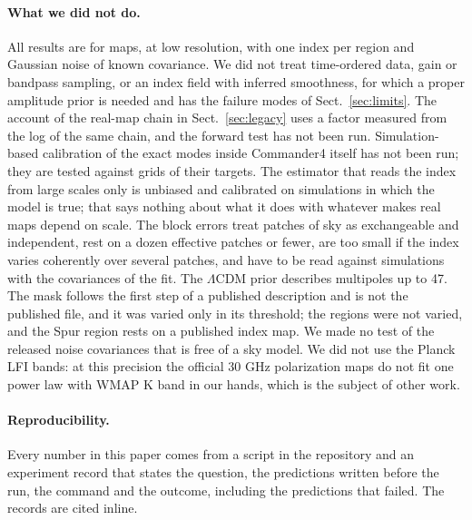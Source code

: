 \paragraph{What we did not do.} All results are for maps, at low resolution, with one index per
region and Gaussian noise of known covariance. We did not treat time-ordered data, gain or bandpass
sampling, or an index field with inferred smoothness, for which a proper amplitude prior is needed
and has the failure modes of Sect.~\ref{sec:limits}. The account of the real-map chain in
Sect.~\ref{sec:legacy} uses a factor measured from the log of the same chain, and the forward test
has not been run. Simulation-based calibration of the exact modes inside Commander4 itself has not
been run; they are tested against grids of their targets. The estimator that reads the index from
large scales only is unbiased and calibrated on simulations in which the model is true; that says
nothing about what it does with whatever makes real maps depend on scale. The block errors treat
patches of sky as exchangeable and independent, rest on a dozen effective patches or fewer, are too
small if the index varies coherently over several patches, and have to be read against simulations
with the covariances of the fit. The $\Lambda$CDM prior describes multipoles up to 47. The mask
follows the first step of a published description and is not the published file, and it was varied
only in its threshold; the regions were not varied, and the Spur region rests on a published index
map. We made no test of the released noise covariances that is free of a sky model. We did not use the Planck LFI bands: at this precision the official 30 GHz polarization
maps do not fit one power law with WMAP K band in our hands, which is the subject of other work.

\paragraph{Reproducibility.} Every number in this paper comes from a script in the repository and an
experiment record that states the question, the predictions written before the run, the command and
the outcome, including the predictions that failed. The records are cited inline.
